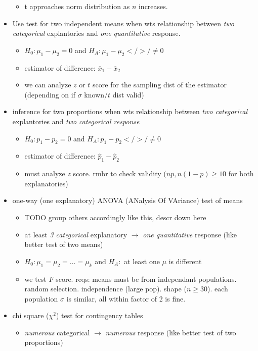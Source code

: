 \documentclass[11pt]{article}
\begin{document}
\begin{itemize}
\begin{itemize}
    \item t approaches norm distribution as $n$ increases.
  \end{itemize}
  \item Use test for two independent means when wts relationship between \emph{two categorical} explantories and \emph{one quantitative} response.
  \begin{itemize}
    \item $H_0: \mu_1 - \mu_2 = 0$ and $H_A: \mu_1 - \mu_2 </>/\ne 0$
    \item estimator of difference: $\overline{x}_1 - \overline{x}_2$
    \item we can analyze $z$ or $t$ score for the sampling dist of the estimator (depending on if $\sigma$ known/$t$ dist valid)
  \end{itemize}
  \item inference for two proportions when wts relationship between \emph{two categorical} explantories and \emph{two categorical response}
  \begin{itemize}
    \item $H_0: p_1 - p_2 = 0$ and $H_A: p_1 - p_2 </>/\ne 0$
    \item estimator of difference: $\hat{p}_1 - \hat{p}_2$
    \item must analyze $z$ score. rmbr to check validity ($np, n(1-p) \ge 10$ for both explanatories)
  \end{itemize}
  \item one-way (one explanatory) ANOVA (ANalysis Of VAriance) test of means
  \begin{itemize}
    \item TODO group others accordingly like this, descr down here
    \item at least \emph{3 categorical} explanatory $\rightarrow$ \emph{one quantitative} response (like better test of two means)
    \item $H_0: \mu_1 = \mu_2 = \dots = \mu_k$ and $H_A:$ at least one $\mu$ is different
    \item we test $F$ score. reqs: means must be from independant populations. random selection. independence (large pop). shape ($n\ge 30$). each population $\sigma$ is similar, all within factor of 2 is fine.
  \end{itemize}
  \item chi square ($\chi ^2$) test for contingency tables
  \begin{itemize}
    \item \emph{numerous} categorical $\rightarrow$ \emph{numerous} response (like better test of two proportions)

\end{itemize}
\end{itemize}
\end{document}
